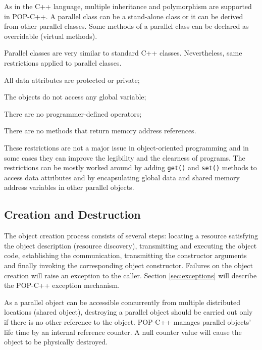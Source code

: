 As in the C++ language, multiple inheritance and polymorphism are supported
in POP-C++. A parallel class can be a stand-alone class or it can be
derived from other parallel classes. Some methods of a
parallel class can be declared as overridable (virtual methods).

Parallel classes are very similar to standard C++ classes. Nevertheless,
same restrictions applied to parallel classes. 

\begin{petitem}

\item All data attributes are protected or private;

\item The objects do not access any global variable;

\item There are no programmer-defined operators;

\item There are no methods that return memory address references.

\end{petitem}

These restrictions are not a major issue in object-oriented programming
and in some cases they can improve the legibility and the clearness of
programs. The restrictions can be mostly worked around by adding
\texttt{get()} and \texttt{set()} methods to access data attributes and
by encapsulating global data and shared memory address variables in
other parallel objects.


\subsection{Creation and Destruction}

The object creation process consists of several steps: locating a
resource satisfying the object description (resource discovery),
transmitting and executing the object code, establishing the
communication, transmitting the constructor arguments and finally
invoking the corresponding object constructor. Failures on the object
creation will raise an exception to the caller. Section
\ref{sec:exceptions} will describe the POP-C++ exception mechanism.

As a parallel object can be accessible concurrently from multiple
distributed locations (shared object), destroying a parallel object
should be carried out only if there is no other reference to the object. 
POP-C++ manages parallel objects' life time by an internal reference
counter. A null counter value will cause the object to be physically
destroyed.

